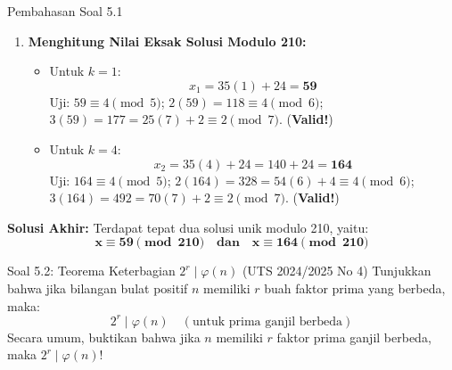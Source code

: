 \documentclass[11pt,a4paper]{article}
\begin{document}
\begin{solusibox}{Pembahasan Soal 5.1}
\begin{enumerate}[leftmargin=*]
    Substitusikan $x = 35k + 24$ ke dalam syarat $x \equiv 2 \pmod 3$:
    \begin{align*}
    35k + 24 &\equiv 2 \pmod 3 \\
    \implies 2k + 0 &\equiv 2 \pmod 3 \implies 2k \equiv 2 \pmod 3 \implies k \equiv 1 \pmod 3
    \end{align*}
    Karena kita mencari solusi dalam modulo $\operatorname{lcm}(5, 6, 7) = 210 = 35 \times 6$, maka $k$ berjalan pada rentang $\{0, 1, 2, 3, 4, 5\}$.
    Nilai $k \in \{0, 1, 2, 3, 4, 5\}$ yang memenuhi $k \equiv 1 \pmod 3$ adalah:
    \[
    k = 1 \quad \text{dan} \quad k = 4
    \]
    \item \textbf{Menghitung Nilai Eksak Solusi Modulo 210:}
    \begin{itemize}
        \item Untuk $k = 1$:
        \[
        x_1 = 35(1) + 24 = \mathbf{59}
        \]
        Uji: $59 \equiv 4 \pmod 5$; $2(59) = 118 \equiv 4 \pmod 6$; $3(59) = 177 = 25(7) + 2 \equiv 2 \pmod 7$. (\textbf{Valid!})
        \item Untuk $k = 4$:
        \[
        x_2 = 35(4) + 24 = 140 + 24 = \mathbf{164}
        \]
        Uji: $164 \equiv 4 \pmod 5$; $2(164) = 328 = 54(6) + 4 \equiv 4 \pmod 6$; $3(164) = 492 = 70(7) + 2 \equiv 2 \pmod 7$. (\textbf{Valid!})
    \end{itemize}
\end{enumerate}
\textbf{Solusi Akhir:} Terdapat tepat dua solusi unik modulo 210, yaitu:
\[
\mathbf{x \equiv 59 \pmod{210} \quad \text{dan} \quad x \equiv 164 \pmod{210}}
\]
\end{solusibox}

\vspace{0.4cm}

\begin{soalbox}{Soal 5.2: Teorema Keterbagian $2^r \mid \varphi(n)$ (UTS 2024/2025 No 4)}
Tunjukkan bahwa jika bilangan bulat positif $n$ memiliki $r$ buah faktor prima yang berbeda, maka:
\[
2^r \mid \varphi(n) \quad (\text{untuk prima ganjil berbeda})
\]
Secara umum, buktikan bahwa jika $n$ memiliki $r$ faktor prima ganjil berbeda, maka $2^r \mid \varphi(n)$!
\end{soalbox}
\end{document}
